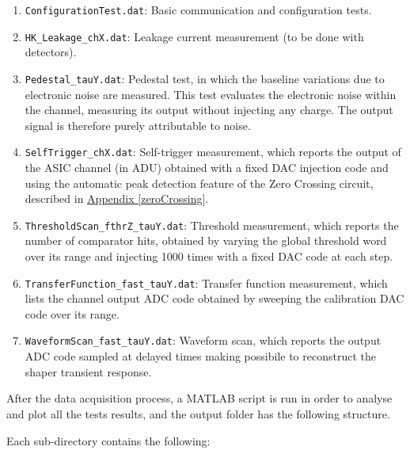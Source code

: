 \begin{enumerate}
    \itemsep0em 
    \item \texttt{ConfigurationTest.dat}: Basic communication and configuration tests.
    \item \texttt{HK\_Leakage\_chX.dat}: Leakage current measurement (to be done with detectors).
    \item \texttt{Pedestal\_tauY.dat}: Pedestal test, in which the baseline variations due to electronic noise are measured. This test evaluates the electronic noise within the channel, measuring its output without injecting any charge. The output signal is therefore purely attributable to noise.
    \item \texttt{SelfTrigger\_chX.dat}: Self-trigger measurement, which reports the output of the ASIC channel (in ADU) obtained with a fixed DAC injection code and using the automatic peak detection feature of the Zero Crossing circuit, described in \hyperref[zeroCrossing]{Appendix \ref{zeroCrossing}}.
    \item \texttt{ThresholdScan\_fthrZ\_tauY.dat}: Threshold measurement, which reports the number of comparator hits, obtained by varying the global threshold word over its range and injecting 1000 times with a fixed DAC code at each step.
    \item \texttt{TransferFunction\_fast\_tauY.dat}: Transfer function measurement, which lists the channel output ADC code obtained by sweeping the calibration DAC code over its range.
    \item \texttt{WaveformScan\_fast\_tauY.dat}: Waveform scan, which reports the output ADC code sampled at delayed times making possibile to reconstruct the shaper transient response.
\end{enumerate}

\noindent
After the data acquisition process, a MATLAB script is run in order to analyse and plot all the tests results, and the output folder has the following structure.\\

\vspace{-0.3cm}

\noindent
Each sub-directory contains the following:


